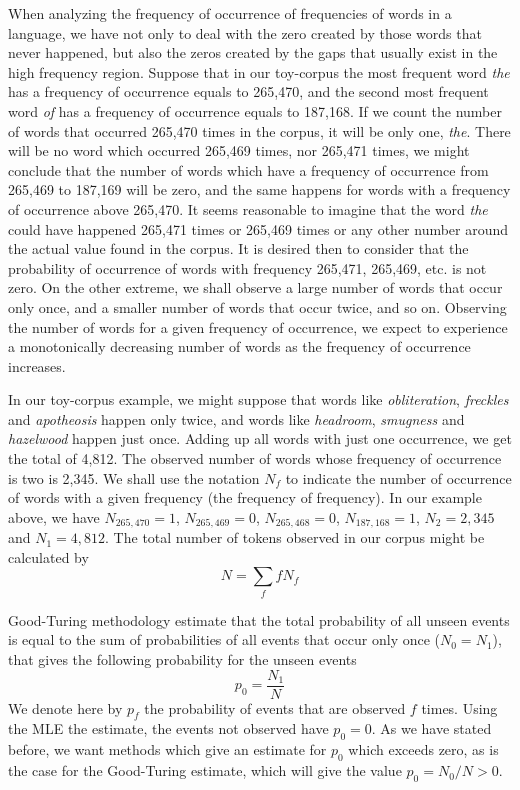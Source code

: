 When analyzing the frequency of occurrence of frequencies of words in a language, we have not only to 
deal with the zero created by those words that never happened, but also the zeros created by the gaps
that usually exist in the high frequency region. Suppose that in our toy-corpus the most frequent word
\textit{the} has a frequency of occurrence equals to 265,470, and the second most frequent word \textit{of}
has a frequency of occurrence equals to 187,168. If we count the number of words that occurred 265,470 times
in the corpus, it will be only one, \textit{the}. There will be no word which occurred 265,469 times,
nor 265,471 times, we might conclude that the number of words which have a frequency of occurrence 
from 265,469 to 187,169 will be zero, and the same happens for words with a frequency of occurrence above 265,470. 
It seems reasonable to imagine that the word \textit{the} could have
happened 265,471 times or 265,469 times or any other number around the actual value found in the corpus.
It is desired then to consider that the probability of occurrence of words
with frequency 265,471, 265,469, etc. is not zero. On the other extreme, we shall observe a large number of
words that occur only once, and a smaller number of words that occur twice, and so on. 
Observing the number of words for a given frequency of occurrence, we expect to experience a monotonically
decreasing number of words as the frequency of occurrence increases. 

In our toy-corpus example, we might suppose that words like \textit{obliteration}, \textit{freckles} and 
\textit{apotheosis} happen only twice, and words like \textit{headroom}, \textit{smugness} and \textit{hazelwood} 
happen just once. Adding up all words with just one occurrence, we get the total of 4,812. The
observed number of words whose frequency of occurrence is two is 2,345.
We shall use the notation $N_f$ to indicate the number of occurrence of words with a given frequency 
(the frequency of frequency). In our example above, we have $N_{265,470} = 1$, $N_{265,469} = 0$, 
$N_{265,468} = 0$, $N_{187,168} = 1$, 
$N_{2} = 2,345$ and $N_{1} = 4,812$. The total number of tokens observed in our corpus might
be calculated by
\begin{equation}
N = \sum_{f} f N_f
\end{equation}

Good-Turing methodology estimate that the total probability of all unseen events is equal to the 
sum of probabilities of all events that occur only once ($N_0 = N_1$), that gives the following
probability for the unseen events
\begin{equation}
p_0 = \frac{N_1}{N}
\end{equation}
We denote here by $p_f$ the probability of events that are observed $f$ times. 
Using the MLE the estimate, the events not observed have $p_0 = 0$. As we have stated before,
we want methods which give an estimate for $p_0$ which exceeds zero, as is the case for
the Good-Turing estimate, which will give the value $p_0 = N_0 / N > 0$.

